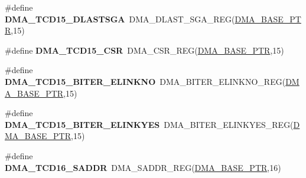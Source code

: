 \begin{DoxyCompactItemize}
\item 
\hypertarget{group___d_m_a___register___accessor___macros_ga490c3331e921f78f70ba0faba15987f1}{}\#define {\bfseries D\+M\+A\+\_\+\+T\+C\+D15\+\_\+\+D\+L\+A\+S\+T\+S\+G\+A}~D\+M\+A\+\_\+\+D\+L\+A\+S\+T\+\_\+\+S\+G\+A\+\_\+\+R\+E\+G(\hyperlink{group___d_m_a___peripheral_ga6997fbc1b1973e9f27170217a3bd6f22}{D\+M\+A\+\_\+\+B\+A\+S\+E\+\_\+\+P\+T\+R},15)\label{group___d_m_a___register___accessor___macros_ga490c3331e921f78f70ba0faba15987f1}

\item 
\hypertarget{group___d_m_a___register___accessor___macros_gab094c103d137f49a7195ff869b5cade1}{}\#define {\bfseries D\+M\+A\+\_\+\+T\+C\+D15\+\_\+\+C\+S\+R}~D\+M\+A\+\_\+\+C\+S\+R\+\_\+\+R\+E\+G(\hyperlink{group___d_m_a___peripheral_ga6997fbc1b1973e9f27170217a3bd6f22}{D\+M\+A\+\_\+\+B\+A\+S\+E\+\_\+\+P\+T\+R},15)\label{group___d_m_a___register___accessor___macros_gab094c103d137f49a7195ff869b5cade1}

\item 
\hypertarget{group___d_m_a___register___accessor___macros_gaf8dff77e7ddaad31d2a84ccd50a0714b}{}\#define {\bfseries D\+M\+A\+\_\+\+T\+C\+D15\+\_\+\+B\+I\+T\+E\+R\+\_\+\+E\+L\+I\+N\+K\+N\+O}~D\+M\+A\+\_\+\+B\+I\+T\+E\+R\+\_\+\+E\+L\+I\+N\+K\+N\+O\+\_\+\+R\+E\+G(\hyperlink{group___d_m_a___peripheral_ga6997fbc1b1973e9f27170217a3bd6f22}{D\+M\+A\+\_\+\+B\+A\+S\+E\+\_\+\+P\+T\+R},15)\label{group___d_m_a___register___accessor___macros_gaf8dff77e7ddaad31d2a84ccd50a0714b}

\item 
\hypertarget{group___d_m_a___register___accessor___macros_gac55c6f49386c76dc2d5705da3b7efb7e}{}\#define {\bfseries D\+M\+A\+\_\+\+T\+C\+D15\+\_\+\+B\+I\+T\+E\+R\+\_\+\+E\+L\+I\+N\+K\+Y\+E\+S}~D\+M\+A\+\_\+\+B\+I\+T\+E\+R\+\_\+\+E\+L\+I\+N\+K\+Y\+E\+S\+\_\+\+R\+E\+G(\hyperlink{group___d_m_a___peripheral_ga6997fbc1b1973e9f27170217a3bd6f22}{D\+M\+A\+\_\+\+B\+A\+S\+E\+\_\+\+P\+T\+R},15)\label{group___d_m_a___register___accessor___macros_gac55c6f49386c76dc2d5705da3b7efb7e}

\item 
\hypertarget{group___d_m_a___register___accessor___macros_ga9e33c2c836c18ca4f0e83f31dd964191}{}\#define {\bfseries D\+M\+A\+\_\+\+T\+C\+D16\+\_\+\+S\+A\+D\+D\+R}~D\+M\+A\+\_\+\+S\+A\+D\+D\+R\+\_\+\+R\+E\+G(\hyperlink{group___d_m_a___peripheral_ga6997fbc1b1973e9f27170217a3bd6f22}{D\+M\+A\+\_\+\+B\+A\+S\+E\+\_\+\+P\+T\+R},16)\label{group___d_m_a___register___accessor___macros_ga9e33c2c836c18ca4f0e83f31dd964191}


\end{DoxyCompactItemize}
